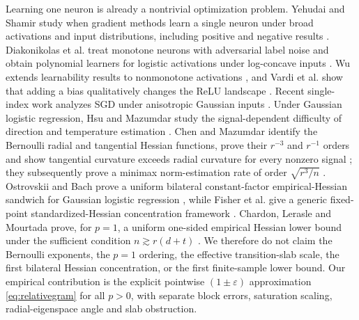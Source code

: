 \documentclass[11pt]{article}
\begin{document}
Learning one neuron is already a nontrivial optimization problem.  Yehudai and Shamir study when gradient methods
learn a single neuron under broad activations and input distributions, including positive and negative results
\cite{yehudai2020}.  Diakonikolas et al. treat monotone neurons with adversarial label noise and obtain polynomial
learners for logistic activations under log-concave inputs \cite{diakonikolas2022}.  Wu extends learnability results to
nonmonotone activations \cite{wu2022}, and Vardi et al. show that adding a bias qualitatively changes the ReLU
landscape \cite{vardi2021}.  Recent single-index work analyzes SGD under anisotropic Gaussian inputs
\cite{braun2025}.  Under Gaussian logistic regression, Hsu and Mazumdar study the signal-dependent difficulty of
direction and temperature estimation \cite{hsu2024}.  Chen and Mazumdar identify the Bernoulli radial and
tangential Hessian functions, prove their $r^{-3}$ and $r^{-1}$ orders and show tangential curvature exceeds radial
curvature for every nonzero signal \cite{chen2026gd}; they subsequently prove a minimax norm-estimation rate of
order $\sqrt{r^3/n}$ \cite{chen2026minimax}.  Ostrovskii and Bach prove a uniform bilateral constant-factor
empirical-Hessian sandwich for Gaussian logistic regression \cite[Eq.~(92)]{ostrovskii2021}, while Fisher et al.
give a generic fixed-point standardized-Hessian concentration framework \cite{fisher2023}.  Chardon, Lerasle and
Mourtada prove, for $p=1$, a uniform one-sided empirical Hessian lower bound under the sufficient condition
$n\gtrsim r(d+t)$ \cite[Theorem 6]{chardon2024}.  We therefore do not claim the Bernoulli exponents, the $p=1$
ordering, the effective transition-slab scale, the first bilateral Hessian concentration, or the first finite-sample
lower bound.  Our empirical contribution is the explicit pointwise $(1\pm\varepsilon)$ approximation
\eqref{eq:relativegram} for all $p>0$, with separate block errors, saturation scaling, radial-eigenspace angle and
slab obstruction.
\end{document}
